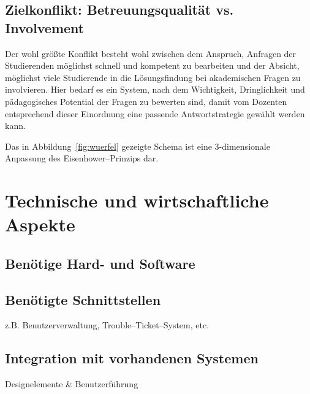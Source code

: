 
\subsection{Zielkonflikt: Betreuungsqualität vs. Involvement} %
\label{sub:zielkonflikt_betreuungsqualitat_vs_involvement}
Der wohl größte Konflikt besteht wohl zwischen dem Anspruch, Anfragen der Studierenden möglichst schnell und kompetent zu bearbeiten und der Absicht, möglichst viele Studierende in die Lösungsfindung bei akademischen Fragen zu involvieren. Hier bedarf es ein System, nach dem Wichtigkeit, Dringlichkeit und pädagogisches Potential der Fragen zu bewerten sind, damit vom Dozenten entsprechend dieser Einordnung eine passende Antwortstrategie gewählt werden kann. 

Das in Abbildung~\ref{fig:wuerfel} gezeigte Schema ist eine 3-dimensionale Anpassung des Eisenhower–Prinzips dar.





\section{Technische und wirtschaftliche Aspekte} %
\label{sec:technische_und_wirtschaftliche_aspekte}

\subsection{Benötige Hard- und Software} %
\label{sub:benotige_hard_und_software}


\subsection{Benötigte Schnittstellen} %
\label{sub:benotigte_schnittstellen}
z.B. Benutzerverwaltung, Trouble–Ticket–System, etc.

\subsection{Integration mit vorhandenen Systemen} %
\label{sub:integration_mit_vorhandenen_systemen}
Designelemente \& Benutzerführung

